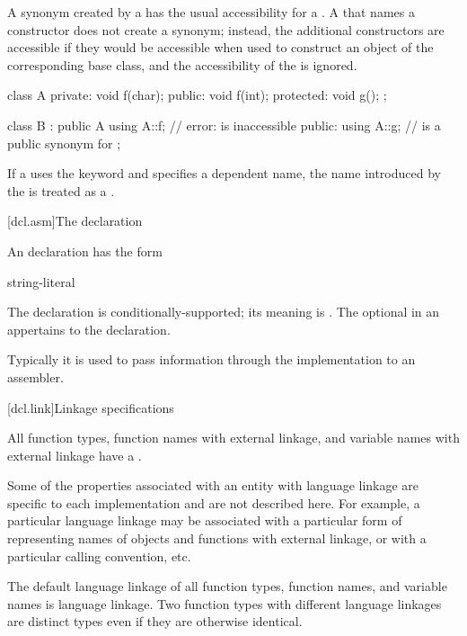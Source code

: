 \pnum
A synonym created by a  has the usual
accessibility for a .
A  that names a constructor does not
create a synonym; instead, the additional constructors
are accessible if they would be accessible
when used to construct an object of the corresponding base class,
and the accessibility of the  is ignored.
\begin{example}
\begin{codeblock}
class A {
private:
    void f(char);
public:
    void f(int);
protected:
    void g();
};

class B : public A {
  using A::f;       // error:  is inaccessible
public:
  using A::g;       //  is a public synonym for 
};
\end{codeblock}
\end{example}

\pnum
If a  uses the keyword  and
specifies a dependent name, the name introduced by the
 is treated as a
.%

[dcl.asm]{The  declaration}%
%
%

\pnum
An  declaration has the form
\begin{bnf}
\br
      \terminal{(} string-literal \terminal{)} \terminal{;}
\end{bnf}

The  declaration is conditionally-supported; its meaning is
.
The optional  in
an  appertains to the  declaration.
\begin{note}
Typically it is used to pass information through the implementation to
an assembler.
\end{note}

[dcl.link]{Linkage specifications}%

\pnum
All function types, function names with external linkage, and variable
names with external linkage have a .
\begin{note}
Some of the properties associated with an entity with language linkage
are specific to each implementation and are not described here. For
example, a particular language linkage may be associated with a
particular form of representing names of objects and functions with
external linkage, or with a particular calling convention, etc.
\end{note}
The default language linkage of all function types, function names, and
variable names is \Cpp{} language linkage. Two function types with
different language linkages are distinct types even if they are
otherwise identical.

